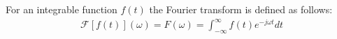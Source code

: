 %
%

\begin{definition} \label{def:Fourier_trans}
For an integrable function $f(t)$ the Fourier transform is defined as follows:
\begin{align*}
\mathcal{F}[f(t)](\omega) = F(\omega) = \int_{-\infty}^\infty f(t) e^{-j \omega t} dt
\end{align*}
\end{definition}

